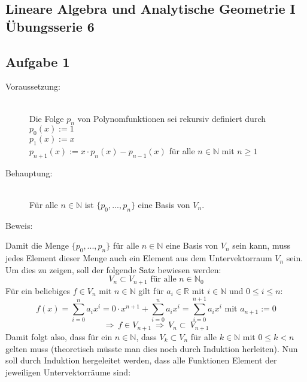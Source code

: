 \documentclass[10pt, a4paper]{article}
\begin{document}
	\begin{center} \section*{Lineare Algebra und Analytische Geometrie I\\ Übungsserie 6} \end{center} %
	\label{sec:lineare_algebra_und_analytische_geometrie_i}


	\subsection*{Aufgabe 1} %
	\label{sub:aufgabe_1}
	
		\begin{description}
			\item[Voraussetzung:] \hfill \\
				Die Folge $p_n$ von Polynomfunktionen sei rekursiv definiert durch
				$p_0(x) := 1$ \\
				$p_1(x) := x$ \\
				$p_{n+1}(x) := x\cdot p_n(x) - p_{n-1}(x)$ für alle $n \in \mathbb{N}$ mit $n \geq 1$
			\item[Behauptung:] \hfill \\
				Für alle $n \in \mathbb{N}$ ist $\{p_0,...,p_n\}$ eine Basis von $V_n$.
			\item[Beweis:]
		\end{description}
		
		Damit die Menge $\{p_0,...,p_n\}$ für alle $n \in \mathbb{N}$ eine Basis von $V_n$ sein kann, muss jedes Element dieser Menge auch ein Element aus dem Untervektorraum $V_n$ sein.
		Um dies zu zeigen, soll der folgende Satz bewiesen werden:
		\[
			V_n \subset V_{n+1} \text{  für alle } n \in \mathbb{N}_0
		\]
		Für ein beliebiges $f \in V_{n}$ mit $n \in \mathbb{N}$ gilt für $a_i \in \mathbb{R}$ mit $i \in \mathbb{N}$ und $0 \leq i \leq n$:
		\[
			f(x) = \sum_{i=0}^n a_ix^i = 0\cdot x^{n+1} + \sum_{i=0}^n a_ix^i = \sum_{i=0}^{n+1} a_ix^i \text{ mit } a_{n+1} := 0
		\] 
		\[
			\Rightarrow \ f \in V_{n+1} \ \Rightarrow \ V_n \subset \ V_{n+1}
		\]
		Damit folgt also, dass für ein $n\in \mathbb{N}$, dass $V_k \subset V_n$ für alle $k\in \mathbb{N}$ mit $0\leq k < n$ gelten muss (theoretisch müsste man dies noch durch Induktion herleiten).
		Nun soll durch Induktion hergeleitet werden, dass alle Funktionen Element der jeweiligen Untervektorräume sind:\\
\end{document}
